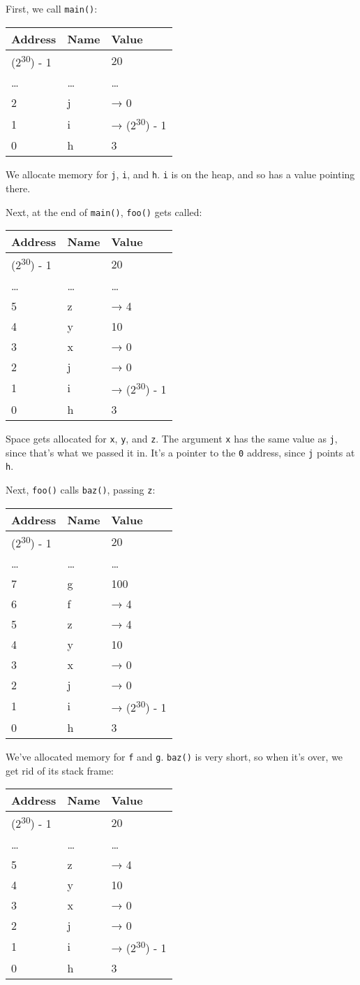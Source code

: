 \documentclass[a4paper,]{book}
\begin{document}
First, we call \texttt{main()}:

\begin{longtable}[c]{@{}lll@{}}
\toprule
Address & Name & Value\tabularnewline
\midrule
\endhead
(2\textsuperscript{30}) - 1 & & 20\tabularnewline
\ldots{} & \ldots{} & \ldots{}\tabularnewline
2 & j & → 0\tabularnewline
1 & i & → (2\textsuperscript{30}) - 1\tabularnewline
0 & h & 3\tabularnewline
\bottomrule
\end{longtable}

We allocate memory for \texttt{j}, \texttt{i}, and \texttt{h}.
\texttt{i} is on the heap, and so has a value pointing there.

Next, at the end of \texttt{main()}, \texttt{foo()} gets called:

\begin{longtable}[c]{@{}lll@{}}
\toprule
Address & Name & Value\tabularnewline
\midrule
\endhead
(2\textsuperscript{30}) - 1 & & 20\tabularnewline
\ldots{} & \ldots{} & \ldots{}\tabularnewline
5 & z & → 4\tabularnewline
4 & y & 10\tabularnewline
3 & x & → 0\tabularnewline
2 & j & → 0\tabularnewline
1 & i & → (2\textsuperscript{30}) - 1\tabularnewline
0 & h & 3\tabularnewline
\bottomrule
\end{longtable}

Space gets allocated for \texttt{x}, \texttt{y}, and \texttt{z}. The
argument \texttt{x} has the same value as \texttt{j}, since that's what
we passed it in. It's a pointer to the \texttt{0} address, since
\texttt{j} points at \texttt{h}.

Next, \texttt{foo()} calls \texttt{baz()}, passing \texttt{z}:

\begin{longtable}[c]{@{}lll@{}}
\toprule
Address & Name & Value\tabularnewline
\midrule
\endhead
(2\textsuperscript{30}) - 1 & & 20\tabularnewline
\ldots{} & \ldots{} & \ldots{}\tabularnewline
7 & g & 100\tabularnewline
6 & f & → 4\tabularnewline
5 & z & → 4\tabularnewline
4 & y & 10\tabularnewline
3 & x & → 0\tabularnewline
2 & j & → 0\tabularnewline
1 & i & → (2\textsuperscript{30}) - 1\tabularnewline
0 & h & 3\tabularnewline
\bottomrule
\end{longtable}

We've allocated memory for \texttt{f} and \texttt{g}. \texttt{baz()} is
very short, so when it's over, we get rid of its stack frame:

\begin{longtable}[c]{@{}lll@{}}
\toprule
Address & Name & Value\tabularnewline
\midrule
\endhead
(2\textsuperscript{30}) - 1 & & 20\tabularnewline
\ldots{} & \ldots{} & \ldots{}\tabularnewline
5 & z & → 4\tabularnewline
4 & y & 10\tabularnewline
3 & x & → 0\tabularnewline
2 & j & → 0\tabularnewline
1 & i & → (2\textsuperscript{30}) - 1\tabularnewline
0 & h & 3\tabularnewline
\bottomrule
\end{longtable}
\end{document}
